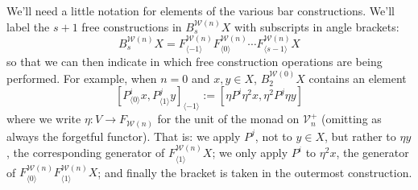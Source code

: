 \documentclass[11pt]{amsart}
\theoremstyle{plain}
\theoremstyle{definition}
\renewcommand{\to}{\longrightarrow}
\newcommand{\calW}{\mathcal{W}}
\newcommand{\calV}{\mathcal{V}}
\theoremstyle{plain}
\newcommand{\vect}[2]{\calV^{#1}_{#2}}
\begin{document}
\begin{Koszul complexes}
We'll need a little notation for elements of the various bar constructions. We'll label the $s+1$ free constructions in $B^{\calW(n)}_{s}X$ with subscripts in angle brackets: 
\[B^{\calW(n)}_{s}X= F^{\calW(n)}_{\langle -1\rangle}F^{\calW(n)}_{\langle 0\rangle}\cdots F^{\calW(n)}_{\langle s-1\rangle}X\]%
so that we can then indicate in which free construction operations are being performed. For example, when $n=0$ and $x,y\in X$, $B_2^{\calW(0)}X$ contains an element
\[[P^i_{\langle 0\rangle}x,P^j_{\langle 1\rangle}y]_{\langle -1\rangle}:=[\eta P^i\eta^2 x,\eta^2P^j\eta y]\]%
where we write $\eta:V\to F_{\calW(n)}$ for the unit of the monad on $\vect{+}{n}$ (omitting as always the forgetful functor). That is: we apply $P^j$, not to $y\in X$, but rather to $\eta y$, the corresponding generator of $F_{\langle 1\rangle}^{\calW(n)}X$; we only apply $P^i$ to $\eta^2 x$, the generator of $F^{\calW(n)}_{\langle 0\rangle}F^{\calW(n)}_{\langle 1\rangle}X$; and finally the bracket is taken in the outermost construction.%


\end{Koszul complexes}
\end{document}
